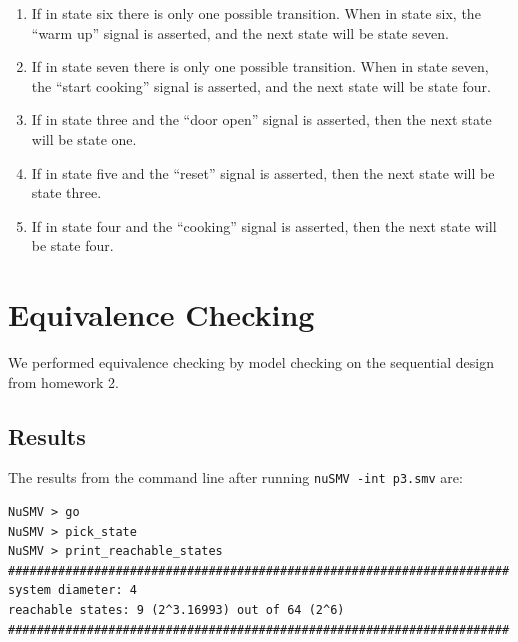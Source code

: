 \documentclass[11pt]{article}
\begin{document}
\begin{enumerate}
\item If in state six there is only one possible transition. When in state six, the “warm up” signal is asserted, and the next state will be state seven.
\item If in state seven there is only one possible transition. When in state seven, the “start cooking” signal is asserted, and the next state will be state four.
\item If in state three and the “door open” signal is asserted, then the next state will be state one.
\item If in state five and the “reset” signal is asserted, then the next state will be state three.
\item If in state four and the “cooking” signal is asserted, then the next state will be state four.
\end{enumerate}	



	
	

%

\section{Equivalence Checking} 
We performed equivalence checking by model checking on the sequential design from homework 2.
\subsection{Results}

The results from the command line after running \texttt{nuSMV -int p3.smv} are:
 \begin{lstlisting}[caption=NuSMV Interactive Output, label=p3_out]	
NuSMV > go
NuSMV > pick_state
NuSMV > print_reachable_states
######################################################################
system diameter: 4
reachable states: 9 (2^3.16993) out of 64 (2^6)
######################################################################
\end{lstlisting}



%  
\end{document}
